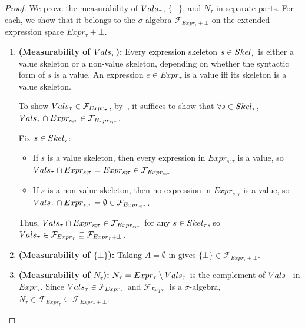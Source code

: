 \begin{proof}
	We prove the measurability of $Vals_\tau$, $\{\bot\}$, and $N_{\tau}$ in separate parts. For each, we show that it belongs to the $\sigma$-algebra $\mathcal{F}_{Expr_{\tau} + \bot}$ on the extended expression space $Expr_{\tau} + \bot$.

	\begin{enumerate}
		\item \textbf{(Measurability of $Vals_{\tau}$):} Every expression skeleton $s \in Skel_{\tau}$ is either a value skeleton or a non-value skeleton, depending on whether the syntactic form of $s$ is a value. An expression $e \in Expr_{\tau}$ is a value iff its skeleton is a value skeleton.
		
		To show $Vals_{\tau} \in \mathcal{F}_{Expr_{\tau}}$, by~, it suffices to show that $\forall s \in Skel_{\tau}$, $Vals_{\tau} \cap Expr_{s;\tau} \in \mathcal{F}_{Expr_{s;\tau}}$.

		Fix $s \in Skel_{\tau}$:
		\begin{itemize}
			\item If $s$ is a value skeleton, then every expression in $Expr_{s;\tau}$ is a value, so $Vals_{\tau} \cap Expr_{s;\tau} = Expr_{s;\tau} \in \mathcal{F}_{Expr_{s;\tau}}$.
			\item If $s$ is a non-value skeleton, then no expression in $Expr_{s;\tau}$ is a value, so $Vals_{\tau} \cap Expr_{s;\tau} = \emptyset \in \mathcal{F}_{Expr_{s;\tau}}$.
		\end{itemize} 

		Thus, $Vals_{\tau} \cap Expr_{s;\tau} \in \mathcal{F}_{Expr_{s;\tau}}$ for any $s \in Skel_{\tau}$, so $Vals_{\tau} \in \mathcal{F}_{Expr_{\tau}} \subseteq \mathcal{F}_{Expr_{\tau} + \bot}$.

		\item \textbf{(Measurability of $\{\bot\}$):} Taking $A = \emptyset$ in 
	         gives $\{\bot\} \in \mathcal{F}_{Expr_\tau + \bot}$.

        \item \textbf{(Measurability of $N_{\tau}$):} $N_{\tau} = Expr_\tau \setminus Vals_{\tau}$ is the 
        complement of $Vals_{\tau}$ in $Expr_\tau$. Since $Vals_{\tau} \in \mathcal{F}_{Expr_\tau}$ 
        and $\mathcal{F}_{Expr_\tau}$ is a $\sigma$-algebra, $N_{\tau} \in 
        \mathcal{F}_{Expr_\tau} \subseteq \mathcal{F}_{Expr_\tau + \bot}$.
	\end{enumerate}
\end{proof}

